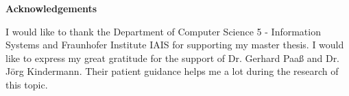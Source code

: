 \thispagestyle{empty}

\centerline{\Large{\textbf{Acknowledgements}}}

\vspace{2cm}

\noindent I would like to thank the Department of Computer Science 5 - Information Systems and Fraunhofer Institute IAIS for supporting my master thesis. I would like to express my great gratitude for the support
of Dr. Gerhard Paaß and Dr. Jörg Kindermann. Their patient guidance helps me a lot during
the research of this topic. 
\newpage
\thispagestyle{empty}

\rule{0cm}{5cm}